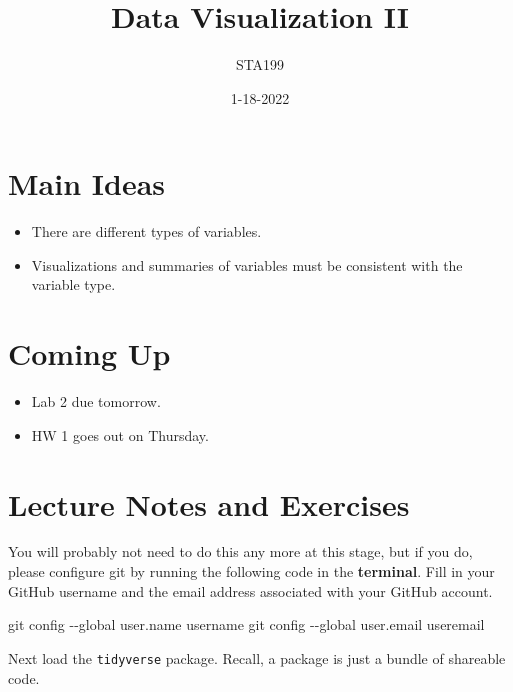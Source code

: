 \documentclass[
]{article}
\title{Data Visualization II}
\author{STA199}
\date{1-18-2022}
\newenvironment{Shaded}{\begin{snugshade}}{\end{snugshade}}
\newcommand{\NormalTok}[1]{#1}
\newcommand{\SpecialCharTok}[1]{\textcolor[rgb]{0.00,0.00,0.00}{#1}}
\newcommand{\StringTok}[1]{\textcolor[rgb]{0.31,0.60,0.02}{#1}}
\providecommand{\tightlist}{%
  \setlength{\itemsep}{0pt}\setlength{\parskip}{0pt}}
\begin{document}
\maketitle

\hypertarget{main-ideas}{%
\section{Main Ideas}\label{main-ideas}}

\begin{itemize}
\tightlist
\item
  There are different types of variables.
\item
  Visualizations and summaries of variables must be consistent with the
  variable type.
\end{itemize}

\hypertarget{coming-up}{%
\section{Coming Up}\label{coming-up}}

\begin{itemize}
\tightlist
\item
  Lab 2 due tomorrow.
\item
  HW 1 goes out on Thursday.
\end{itemize}

\hypertarget{lecture-notes-and-exercises}{%
\section{Lecture Notes and
Exercises}\label{lecture-notes-and-exercises}}

You will probably not need to do this any more at this stage, but if you
do, please configure git by running the following code in the
\textbf{terminal}. Fill in your GitHub username and the email address
associated with your GitHub account.

\begin{Shaded}
\begin{Highlighting}[]
\NormalTok{git config }\SpecialCharTok{{-}{-}}\NormalTok{global user.name }\StringTok{\textquotesingle{}username\textquotesingle{}}
\NormalTok{git config }\SpecialCharTok{{-}{-}}\NormalTok{global user.email }\StringTok{\textquotesingle{}useremail\textquotesingle{}}
\end{Highlighting}
\end{Shaded}

Next load the \texttt{tidyverse} package. Recall, a package is just a
bundle of shareable code.
\end{document}
